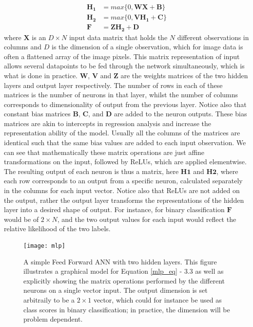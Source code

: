 \documentclass[12pt]{report}
\begin{document}
\begin{align} \label{mlp_eq}
  \mathbf{H_1} &= max\{0, \mathbf{W}\mathbf{X} + \mathbf{B}\} \\
  \mathbf{H_2} &= max\{0, \mathbf{V}\mathbf{H_1} + \mathbf{C}\} \\ 
  \mathbf{F} &= \mathbf{Z} \mathbf{H_{2}} + \mathbf{D} 
\end{align}
where $\mathbf{X}$ is an $D\times N$ input data matrix that holds the $N$ different observations in columns and $D$ is the dimension of a single observation, which for image data is often a flattened array of the image pixels. This matrix representation of input allows several datapoints to be fed through the network simultaneously, which is what is done in practice. $\mathbf{W}$, $\mathbf{V}$ and $\mathbf{Z}$ are the weights matrices of the two hidden layers and output layer respectively. The number of rows in each of these matrices is the number of neurons in that layer, whilst the number of columns corresponds to dimensionality of output from the previous layer. Notice also that constant bias matrices $\mathbf{B}$, $\mathbf{C}$, and $\mathbf{D}$ are added to the neuron outputs. These bias matrices are akin to intercepts in regression analysis and increase the representation ability of the model. Usually all the columns of the matrices are identical such that the same bias values are added to each input observation. We can see that mathematically these matrix operations are just affine transformations on the input, followed by ReLUs, which are applied elementwise. The resulting output of each neuron is thus a matrix, here $\mathbf{H1}$ and $\mathbf{H2}$, where each row corresponds to an output from a specific neuron, calculated separately in the columns for each input vector. Notice also that ReLUs are not added on the output, rather the output layer transforms the representations of the hidden layer into a desired shape of output. For instance, for binary classification $\mathbf{F}$ would be of $2 \times N$, and the two output values for each input would reflect the relative likelihood of the two labels.

\begin{figure}[h!]
  \centering
	\texttt{[image: mlp]}
	\caption{A simple Feed Forward ANN with two hidden layers. This figure illustrates a graphical model for Equation \ref{mlp_eq} - 3.3 as well as explicitly showing the matrix operations performed by the different neurons on a single vector input. The output dimension is set arbitraily to be a $2\times1$ vector, which could for instance be used as class scores in binary classification; in practice, the dimension will be problem dependent.}
	\label{fig:mlp}
\end{figure}
\end{document}
